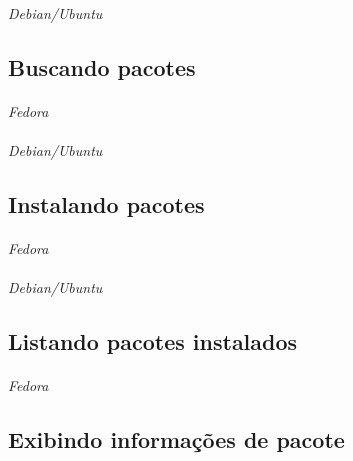 \documentclass[a4paper,9pt]{extarticle}
\begin{document}
\begin{multicols}{2}
	\paragraph{} \emph{Debian/Ubuntu}
	
\subsection{Buscando pacotes}
	
	\paragraph{} \emph{Fedora}
	
	\paragraph{} \emph{Debian/Ubuntu}
	
\subsection{Instalando pacotes}

	\paragraph{} \emph{Fedora}
	
	\paragraph{} \emph{Debian/Ubuntu}
	
\subsection{Listando pacotes instalados}
	
	\paragraph{} \emph{Fedora}
	
\subsection{Exibindo informações de pacote}
	

\end{multicols}
\end{document}
